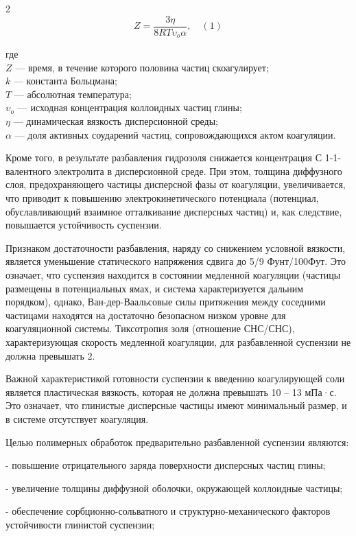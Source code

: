 \begin{multicols}{2}
\begin{equation}
Z = \frac{3 \eta}{8 R T \upsilon_{o} \alpha}, \quad (1)
\end{equation}

где \\
$Z$ --- время, в течение которого половина частиц скоагулирует; \\
$k$ --- константа Больцмана; \\
$T$ --- абсолютная температура; \\
$\upsilon_{o}$ --- исходная концентрация коллоидных частиц глины; \\
$\eta$ --- динамическая вязкость дисперсионной среды; \\
$\alpha$ --- доля активных соударений частиц, сопровождающихся актом коагуляции.

Кроме того, в результате разбавления гидрозоля снижается концентрация С
1-1-валентного электролита в дисперсионной среде. При этом, толщина
диффузного слоя, предохраняющего частицы дисперсной фазы от коагуляции,
увеличивается, что приводит к повышению электрокинетического потенциала
(потенциал, обуславливающий взаимное отталкивание дисперсных частиц) и,
как следствие, повышается устойчивость суспензии.

Признаком достаточности разбавления, наряду со снижением условной
вязкости, является уменьшение статического напряжения сдвига до 5/9
Фунт/100Фут. Это означает, что суспензия находится в
состоянии медленной коагуляции (частицы размещены в потенциальных ямах,
и система характеризуется дальним порядком), однако, Ван-дер-Ваальсовые
силы притяжения между соседними частицами находятся на достаточно
безопасном низком уровне для коагуляционной системы. Тиксотропия золя
(отношение СНС/СНС), характеризующая
скорость медленной коагуляции, для разбавленной суспензии не должна
превышать 2.

Важной характеристикой готовности суспензии к введению коагулирующей
соли является пластическая вязкость, которая не должна превышать 10 --
13 мПа·с. Это означает, что глинистые дисперсные частицы имеют
минимальный размер, и в системе отсутствует коагуляция.

Целью полимерных обработок предварительно разбавленной суспензии
являются:

- повышение отрицательного заряда поверхности дисперсных частиц глины;

- увеличение толщины диффузной оболочки, окружающей коллоидные частицы;

- обеспечение сорбционно-сольватного и структурно-механического факторов
устойчивости глинистой суспензии;


\end{multicols}
